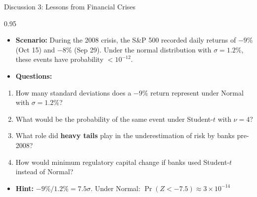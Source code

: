 \documentclass[9pt, aspectratio=169, t]{beamer}
\begin{document}
\begin{frame}{Discussion 3: Lessons from Financial Crises}
\begin{cminipage}{0.95\textwidth}
    \begin{itemize}\setlength{\itemsep}{0pt}
        \item \textbf{Scenario:} During the 2008 crisis, the S\&P 500 recorded daily returns of $-9\%$ (Oct 15) and $-8\%$ (Sep 29). Under the normal distribution with $\sigma = 1.2\%$, these events have probability $< 10^{-12}$.
        \item \textbf{Questions:}
    \end{itemize}
    \begin{enumerate}\setlength{\itemsep}{0pt}
        \item How many standard deviations does a $-9\%$ return represent under Normal with $\sigma = 1.2\%$?
        \item What would be the probability of the same event under Student-$t$ with $\nu = 4$?
        \item What role did \textbf{heavy tails} play in the underestimation of risk by banks pre-2008?
        \item How would minimum regulatory capital change if banks used Student-$t$ instead of Normal?
    \end{enumerate}

    \vspace{0.2cm}
    \begin{itemize}\setlength{\itemsep}{0pt}
        \item \textbf{Hint:} $-9\% / 1.2\% = 7.5\sigma$. Under Normal: $\Pr(Z < -7.5) \approx 3 \times 10^{-14}$
    \end{itemize}
\end{cminipage}
\end{frame}
\end{document}
